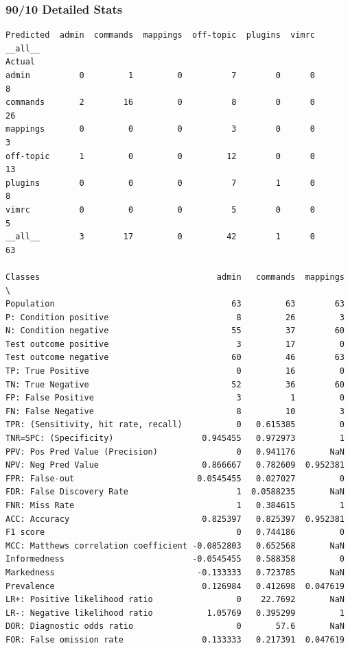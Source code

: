 \documentclass[12pt, a4paper]{article}
\begin{document}
\subsubsection{90/10 Detailed Stats}
\label{9090stats}
\begin{verbatim}
Predicted  admin  commands  mappings  off-topic  plugins  vimrc  __all__
Actual                                                                  
admin          0         1         0          7        0      0        8
commands       2        16         0          8        0      0       26
mappings       0         0         0          3        0      0        3
off-topic      1         0         0         12        0      0       13
plugins        0         0         0          7        1      0        8
vimrc          0         0         0          5        0      0        5
__all__        3        17         0         42        1      0       63

Classes                                    admin   commands  mappings  \
Population                                    63         63        63   
P: Condition positive                          8         26         3   
N: Condition negative                         55         37        60   
Test outcome positive                          3         17         0   
Test outcome negative                         60         46        63   
TP: True Positive                              0         16         0   
TN: True Negative                             52         36        60   
FP: False Positive                             3          1         0   
FN: False Negative                             8         10         3   
TPR: (Sensitivity, hit rate, recall)           0   0.615385         0   
TNR=SPC: (Specificity)                  0.945455   0.972973         1   
PPV: Pos Pred Value (Precision)                0   0.941176       NaN   
NPV: Neg Pred Value                     0.866667   0.782609  0.952381   
FPR: False-out                         0.0545455   0.027027         0   
FDR: False Discovery Rate                      1  0.0588235       NaN   
FNR: Miss Rate                                 1   0.384615         1   
ACC: Accuracy                           0.825397   0.825397  0.952381   
F1 score                                       0   0.744186         0   
MCC: Matthews correlation coefficient -0.0852803   0.652568       NaN   
Informedness                          -0.0545455   0.588358         0   
Markedness                             -0.133333   0.723785       NaN   
Prevalence                              0.126984   0.412698  0.047619   
LR+: Positive likelihood ratio                 0    22.7692       NaN   
LR-: Negative likelihood ratio           1.05769   0.395299         1   
DOR: Diagnostic odds ratio                     0       57.6       NaN   
FOR: False omission rate                0.133333   0.217391  0.047619   


\end{verbatim}
\end{document}
